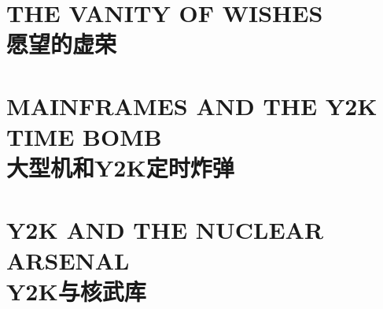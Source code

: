\section[愿望的虚荣]{THE VANITY OF WISHES\\愿望的虚荣}


\section[大型机和Y2K定时炸弹]{MAINFRAMES AND THE Y2K TIME BOMB\\大型机和Y2K定时炸弹}


\section[Y2K与核武库]{Y2K AND THE NUCLEAR ARSENAL\\Y2K与核武库}



\begin{paracol}{2}[]
\switchcolumn
\end{paracol}

